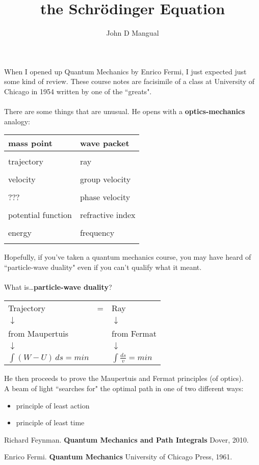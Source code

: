 \documentclass[12pt]{article}
\title{the Schr\"{o}dinger Equation}
\author{John D Mangual}
\date{}
\begin{document}
\selectfont \fontsize{12.5}{15}\selectfont

\maketitle

\noindent When I opened up Quantum Mechanics by Enrico Fermi, I just expected just some kind of review.  These course notes are facisimile of a class at University of Chicago in 1954 written by one of the ``greats". \\ \\
There are some things that are unusual.  He opens with a \textbf{optics-mechanics} analogy:
\begin{center}
\begin{tabular}{l|l} 
mass point & wave packet \\ \hline  \\ 
trajectory & ray \\  \hline \\
velocity & group velocity \\ \hline  \\
??? & phase velocity \\  \hline \\
potential function & refractive index \\ \hline  \\
energy & frequency \\  \hline \\
\end{tabular}
\end{center}
Hopefully, if you've taken a quantum mechanics course, you may have heard of ``particle-wave duality" even if you can't qualify what it meant.  \\ \\
What is\dots \textbf{particle-wave duality}? 
\begin{center}
\begin{tabular}{lcl}
Trajectory &=& Ray \\ 
$\downarrow$ & & $\downarrow$ \\
from Maupertuis & & from Fermat \\ 
$\downarrow$ & & $\downarrow$ \\
$\int (W - U)\, ds = min $ & & $\int \frac{ds}{v} = min$
\end{tabular}
\end{center}
He then proceeds to prove the Maupertuis and Fermat principles (of optics). \\
A beam of light ``searches for" the optimal path in one of two different ways:
\begin{itemize}
\item principle of least action
\item principle of least time
\end{itemize}
\vfill

\begin{thebibliography}{}

\item Richard Feynman.  \textbf{Quantum Mechanics and Path Integrals} Dover, 2010.

\item Enrico Fermi.  \textbf{Quantum Mechanics} University of Chicago Press, 1961.

\end{thebibliography}
\end{document}
